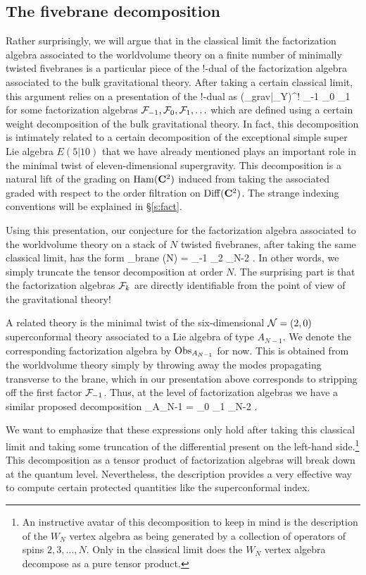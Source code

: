 \subsection{The fivebrane decomposition}
Rather surprisingly, we will argue that in the classical limit the factorization algebra associated to the worldvolume theory on a finite number of minimally twisted fivebranes is a particular piece of the $!$-dual of the factorization algebra associated to the bulk gravitational theory.
After taking a certain classical limit, this argument relies on a presentation of the $!$-dual as
\beqn
(\Obs_{grav}|_{Y})^{!} \simeq \cF_{-1} \otimes \cF_0 \otimes \cF_1 \otimes \cdots 
\eeqn
for some factorization algebras $\mathcal F_{-1},\mathcal F_0, \mathcal F_{1},\ldots$ which are defined using a certain weight decomposition of the bulk gravitational theory.
In fact, this decomposition is intimately related to a certain decomposition of the exceptional simple super Lie algebra $E(5|10)$ that we have already mentioned plays an important role in the minimal twist of eleven-dimensional supergravity. This decomposition is a natural lift of the grading on $\operatorname{Ham}(\mathbf{C}^{2})$ induced from taking the associated graded with respect to the order filtration on $\operatorname{Diff} (\mathbf{C}^{2})$. The strange indexing conventions will be explained in \S\ref{s:fact}.

Using this presentation, our conjecture for the factorization algebra associated to the worldvolume theory on a stack of $N$ twisted fivebranes, after taking the same classical limit, has the form
\beqn\label{eqn:finiteTensor}
\Obs_{brane} (N) = \cF_{-1} \otimes \cF_2 \otimes \cdots \otimes \cF_{N-2} .
\eeqn
In other words, we simply truncate the tensor decomposition at order $N$.
The surprising part is that the factorization algebras $\mathcal F_k$ are directly identifiable from the point of view of the gravitational theory!

A related theory is the minimal twist of the six-dimensional $\mathcal N=(2,0)$ superconformal theory associated to a Lie algebra of type $A_{N-1}$.
We denote the corresponding factorization algebra by $\operatorname{Obs}_{A_{N-1}}$ for now. 
This is obtained from the worldvolume theory simply by throwing away the modes propagating transverse to the brane, which in our presentation above corresponds to stripping off the first factor $\mathcal F_{-1}$. 
Thus, at the level of factorization algebras we have a similar proposed decomposition
\beqn
\Obs_{A_{N-1}} = \cF_0 \otimes \cF_1 \otimes \cdots \otimes \cF_{N-2} .
\eeqn

We want to emphasize that these expressions only hold after taking this classical limit and taking some truncation of the differential present on the left-hand side.\footnote{An instructive avatar of this decomposition to keep in mind is the description of the $W_N$ vertex algebra as being generated by a collection of operators of spins $2,3,\ldots, N$.
Only in the classical limit does the $W_N$ vertex algebra decompose as a pure tensor product.}
This decomposition as a tensor product of factorization algebras will break down at the quantum level.
Nevertheless, the description provides a very effective way to compute certain protected quantities like the superconformal index.


